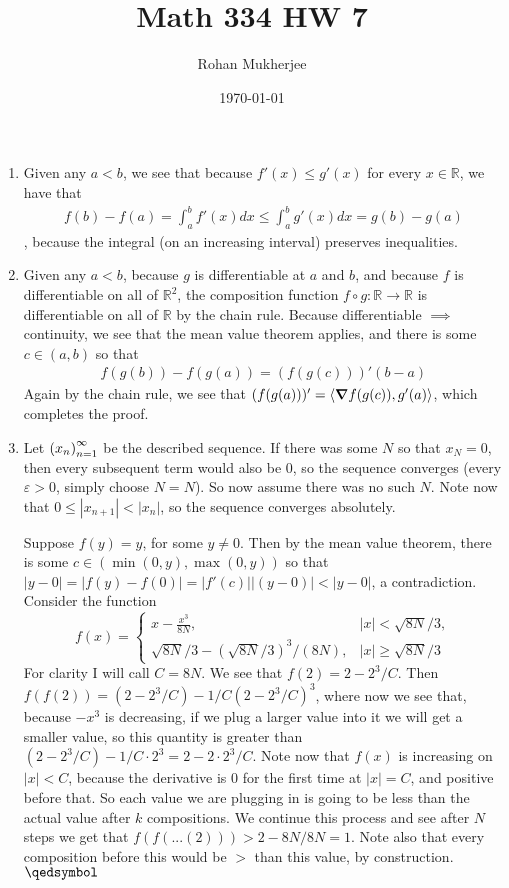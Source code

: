 \documentclass[12pt]{article}
\title{Math 334 HW 7}
\date{\today}
\author{Rohan Mukherjee}
\theoremstyle{definition}
\theoremstyle{remark}
\newcommand{\R}{\mathbb{R}}
\renewcommand{\ip}[2]{\langle #1, #2 \rangle}
\newcommand{\ve}{\varepsilon}
\renewcommand{\qed}{\hfill\qedsymbol}
\newcommand{\seq}[2]{\qty(#1_#2)_{#2=1}^{\infty}}
\begin{document}
	\maketitle
	\begin{enumerate}[leftmargin=\labelsep]
		\item 
		Given any $a < b$, we see that because $f'(x) \leq g'(x)$ for every $x \in \R$, we have that
		\begin{align*}
			f(b)-f(a) = \int_{a}^{b} f'(x)dx \leq \int_{a}^{b} g'(x)dx = g(b)-g(a)
		\end{align*}, because the integral (on an increasing interval) preserves inequalities.
		
		\item 
		Given any $a < b$, because $g$ is differentiable at $a$ and $b$, and because $f$ is differentiable on all of $\R^2$, the composition function $f \circ g: \R \to \R$ is differentiable on all of $\R$ by the chain rule. Because differentiable $\implies$ continuity, we see that the mean value theorem applies, and there is some $c \in (a, b)$ so that 
			\begin{align*}
				f(g(b))-f(g(a)) = (f(g(c)))'(b-a)
			\end{align*}
		Again by the chain rule, we see that $(f(g(a)))' = \ip{\grad{f(g(c))}}{g'(a)}$, which completes the proof.
		
		\item 
		Let $\seq{x}{n}$ be the described sequence. If there was some $N$ so that $x_N = 0$, then every subsequent term would also be $0$, so the sequence converges (every $\ve > 0$, simply choose $N = N$). So now assume there was no such $N$. Note now that $0 \leq |x_{n+1}| < |x_n|$, so the sequence converges absolutely. 
		
		Suppose $f(y)=y$, for some $y \neq 0$. Then by the mean value theorem, there is some $c \in (\min(0, y), \max(0, y))$ so that $|y-0| = |f(y)-f(0)|=|f'(c)||(y-0)| < |y-0|$, a contradiction. 
		Consider the function 
		$$
			f(x) = 
			\begin{cases}
			x-\frac{x^3}{8N}, & |x| < \sqrt{8N}/3, \\
			\sqrt{8N}/3 - (\sqrt{8N}/3)^3/(8N), & |x| \geq \sqrt{8N}/3
			\end{cases}
	$$
	For clarity I will call $C = 8N$. We see that $f(2) = 2 - 2^3/C$. Then $f(f(2)) = (2 - 2^3/C) - 1/C(2-2^3/C)^3$, where now we see that, because $-x^3$ is decreasing, if we plug a larger value into it we will get a smaller value, so this quantity is greater than $(2-2^3/C)-1/C \cdot 2^3 = 2 - 2 \cdot 2^3/C$. Note now that $f(x)$ is increasing on $|x| < C$, because the derivative is $0$ for the first time at $|x| = C$, and positive before that. So each value we are plugging in is going to be less than the actual value after $k$ compositions. We continue this process and see after $N$ steps we get that $f(f(...(2))) > 2 - 8N/8N = 1$. Note also that every composition before this would be $>$ than this value, by construction. $\qed$
	

\end{enumerate}
\end{document}
